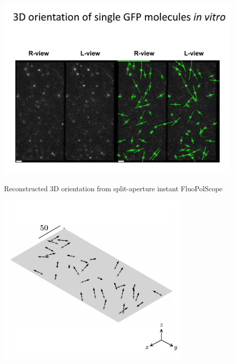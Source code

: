 \documentclass[presentation]{beamer}
\begin{document}
\begin{frame}[label=sec-8]{}
\begin{center}
  \includegraphics[width=0.9\textwidth, interpolate=true]{figs/data}\\
\end{center}
\end{frame}

\begin{frame}[label=sec-9]{Reconstructed 3D orientation from split-aperture instant FluoPolScope}
\begin{center}
  \includegraphics[width=0.7\textwidth, interpolate=true]{figs/frame01}\\
\end{center}
\end{frame}
\end{document}
